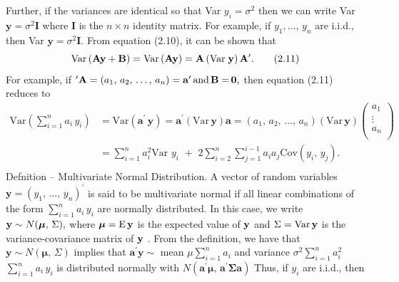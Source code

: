 \documentclass[11pt]{article}
\begin{document}
Further, if the variances are identical so that Var \(y_{i}=\sigma^{2}\) then we can write
Var \(\mathbf{y}=\sigma^{2} \mathbf{I}\) where \(\mathbf{I}\) is the \(n \times n\) identity matrix. For example, if \(y_{1} , \dots, \, y_{n}\) are
i.i.d., then Var \(\mathbf{y}=\sigma^{2} \mathbf{I} .\)
From equation (2.10), it can be shown that
\[
\mathrm{V a r} \left( {\bf A y+B} \right)=\mathrm{V a r} \left( {\bf A y} \right)={\bf A} \left( {\mathrm{V a r} \; {\bf y}} \right) {\bf A^{\prime}} . \tag{2.11}
\]
For example, if \({' {\bf A}=( a_{1} , \, a_{2} , \, \ldots, \, a_{n} )}={\bf a}^{\prime} \, \mathrm{a n d} \, {\bf B=} \, {\bf0} ,\) then equation (2.11) reduces
to
\[
\begin{aligned} {\mathrm{V a r} \left( \sum_{i=1}^{n} a_{i} \, y_{i} \right)} & {{}=\mathrm{V a r} \left( \mathbf{a}^{\prime} \, \mathbf{y} \right)=\mathbf{a}^{\prime} \left( \mathrm{V a r} \, \mathbf{y} \right) \mathbf{a}=\left( a_{1} , \, a_{2} , \, \dots, \, a_{n} \right) \left( \mathrm{V a r} \, \mathbf{y} \right) \left( \begin{matrix} {a_{1}} \\ {\vdots} \\ {a_{n}} \\ \end{matrix} \right)} \\ {} & {{}=\sum_{i=1}^{n} a_{i}^{2} \mathrm{V a r} \, \, y_{i} \, \,+\, \, 2 \sum_{i=2}^{n} \sum_{j=1}^{i-1} a_{i} a_{j} \mathrm{C o v} ( y_{i} , \, y_{j} ) .} \\ \end{aligned}
\]
 Defnition -- Multivariate Normal Distribution. A vector of random variables
\(\mathbf{y}=( y_{1} , \, \ldots, \, y_{n} )^{\prime}\) is said to be multivariate normal if all linear combinations of
 the form \(\sum_{i=1}^{n} a_{i} \, y_{i}\) are normally distributed. In this case, we write \({\bf y} \sim N ( {\boldsymbol\mu} , \, \Sigma) ,\)
where \(\boldsymbol{\mu}=\operatorname{E} {\bf y}\) is the expected value of \({\bf y}\) and \(\Sigma=\mathrm{V a r} \, {\bf y}\) is the variance-covariance
matrix of \({\bf y}\) . From the definition, we have that \(\mathbf{y} \sim N ( \boldsymbol{\mu} , \, \Sigma)\) implies that \(\mathbf{a}^{\prime} \mathbf{y} \sim\)
mean \(\mu\sum_{i=1}^{n} a_{i}\) and variance \(\sigma^{2} \sum_{i=1}^{n} a_{i}^{2}\) \(\sum_{i=1}^{n} a_{i} \, y_{i}\) is distributed normally with
\(N ( \mathbf{a}^{\prime} \boldsymbol{\mu} , \, \mathbf{a}^{\prime} \boldsymbol{\Sigma} \mathbf{a} )\) Thus, if \(y_{i}\) are i.i.d., then
\clearpage
\end{document}
